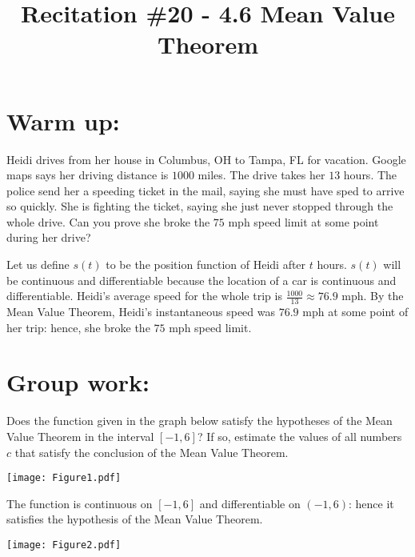 \documentclass[handout,nooutcomes]{ximera}
\title{Recitation \#20 - 4.6 Mean Value Theorem}
\begin{document}
\begin{abstract}		\end{abstract}
\maketitle

\section*{Warm up:} 
Heidi drives from her house in Columbus, OH to Tampa, FL for vacation.  Google maps says her driving distance is $1000$ miles.  The drive takes her $13$ hours.  The police send her a speeding ticket in the mail, saying she must have sped to arrive so quickly.  She is fighting the ticket, saying she just never stopped through the whole drive.  Can you prove she broke the $75$ mph speed limit at some point during her drive? 
		\begin{freeResponse}
		Let us define $s(t)$ to be the position function of Heidi after $t$ hours.  $s(t)$ will be continuous and differentiable because the location of a car is continuous and differentiable.  Heidi’s average speed for the whole trip is $\frac{1000}{13}\approx 76.9$ mph.  By the Mean Value Theorem, Heidi’s instantaneous speed was $76.9$ mph at some point of her trip: hence, she broke the $75$ mph speed limit.  
		\end{freeResponse}	
		
		
		

	
	
	
	
	

\section*{Group work:}



\begin{problem}
Does the function given in the graph below satisfy the hypotheses of the Mean Value Theorem in the interval $[-1,6]$?  If so, estimate the values of all numbers $c$ that satisfy the conclusion of the Mean Value Theorem.  
	\begin{image}
	\texttt{[image: Figure1.pdf]}
	\end{image}
	
		\begin{freeResponse}
		The function is continuous on $[-1,6]$ and differentiable on $(-1,6)$: hence it satisfies the hypothesis of the Mean Value Theorem.
			\begin{image}
			\texttt{[image: Figure2.pdf]}
			\end{image}
			
		\end{freeResponse}
		
		
		

\end{problem}
\end{document}

